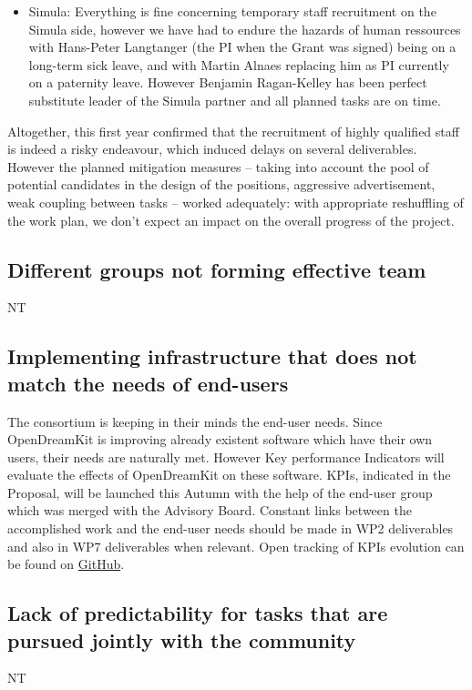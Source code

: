 \documentclass{deliverablereport}
\begin{document}
\begin{itemize}
\item{Simula:} Everything is fine concerning temporary staff recruitment on the Simula side, however we have had to endure the hazards of human ressources with Hans-Peter Langtanger (the PI when the Grant was signed) being on a long-term sick leave, and with Martin Alnaes replacing him as PI currently on a paternity leave. However Benjamin Ragan-Kelley has been perfect  substitute leader of the Simula partner and all planned tasks are on time.\\
\end{itemize}


Altogether, this first year confirmed that the recruitment of highly
qualified staff is indeed a risky endeavour, which induced delays on
several deliverables. However the planned mitigation measures --
taking into account the pool of potential candidates in the design of
the positions, aggressive advertisement, weak coupling between tasks
-- worked adequately: with appropriate reshuffling of the work plan,
we don't expect an impact on the overall progress of the project.

\subsection{Different groups not forming effective team}
NT
\subsection{Implementing infrastructure that does not match the needs of end-users}

The consortium is keeping in their minds the end-user needs. Since OpenDreamKit is improving already existent software which have their own users, their needs are naturally met. However Key performance Indicators will evaluate the effects of OpenDreamKit on these software. KPIs, indicated in the Proposal, will be launched this Autumn with the help of the end-user group which was merged with the Advisory Board. Constant links between the accomplished work and the end-user needs should be made in WP2 deliverables and also in WP7 deliverables when relevant.
Open tracking of KPIs evolution can be found on \href{https://github.com/OpenDreamKit/OpenDreamKit/labels/KPI}{GitHub}.

\subsection{Lack of predictability for tasks that are pursued jointly with the community}
NT
\end{document}
